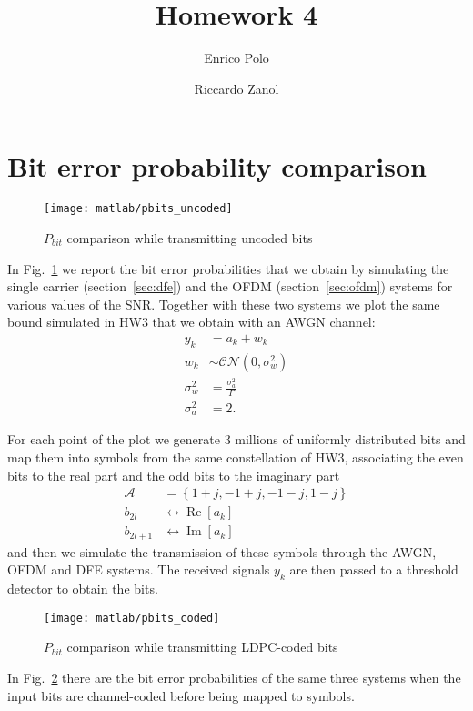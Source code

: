 \documentclass[a4paper,oneside]{article}
\author{Enrico Polo \and Riccardo Zanol}
\title{Homework 4}
\renewcommand{\Re}[1]{\operatorname{Re}\left[#1\right]}
\renewcommand{\Im}[1]{\operatorname{Im}\left[#1\right]}
\newcommand{\distr}[0]{\sim}
\begin{document}
\maketitle
\section{Bit error probability comparison}
\begin{figure}[htbp]
  \centering
  \texttt{[image: matlab/pbits\_uncoded]}
  \caption{$P_{bit}$ comparison while transmitting uncoded bits}
  \label{plot:uncoded}
\end{figure}
In Fig.~\ref{plot:uncoded} we report the bit error probabilities that
we obtain by simulating the single carrier (section~\ref{sec:dfe}) and
the OFDM (section~\ref{sec:ofdm}) systems for various values of the
SNR. Together with these two systems we plot the same bound
simulated in HW3 that we obtain with an AWGN channel:
\begin{align}
  y_k &= a_k + w_k \\
  w_k & \distr \mathcal{CN}(0, \sigma^2_w) \\
  \sigma^2_w &= \frac{\sigma^2_a}{\Gamma} \\
  \sigma^2_a &= 2 .
\end{align}

For each point of the plot we generate 3 millions of uniformly
distributed bits and map them into symbols from the same constellation
of HW3, associating the even bits to the real part and the odd bits
to the imaginary part
\begin{align}
  \mathcal{A} &= \left\{ 1+j, -1+j, -1-j, 1-j \right\} \\
  b_{2l}  & \leftrightarrow \Re{a_k} \\
  b_{2l+1}  & \leftrightarrow \Im{a_k}
\end{align}
and then we simulate the transmission of these symbols through the
AWGN, OFDM and DFE systems. The received signals $y_k$ are then passed
to a threshold detector to obtain the bits.

\begin{figure}[htbp]
  \centering
  \texttt{[image: matlab/pbits\_coded]}
  \caption{$P_{bit}$ comparison while transmitting LDPC-coded bits}
  \label{plot:coded}
\end{figure}
In Fig.~\ref{plot:coded} there are the bit error probabilities of the
same three systems when the input bits are channel-coded before being
mapped to symbols.
\end{document}
